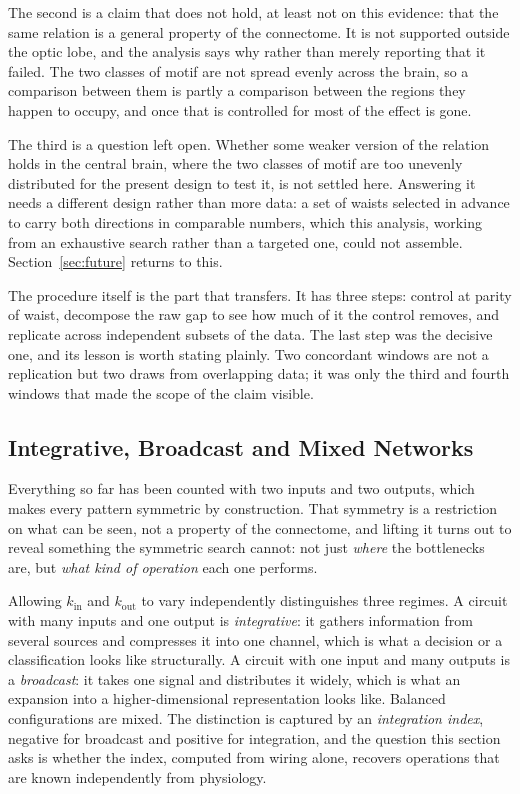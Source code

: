 \documentclass[12pt,a4paper,oneside]{article}
\theoremstyle{definition}
\theoremstyle{plain}
\newcommand{\kin}{k_{\mathrm{in}}}
\newcommand{\kout}{k_{\mathrm{out}}}
\begin{document}
The second is a claim that does not hold, at least not on this evidence: that
the same relation is a general property of the connectome. It is not
supported outside the optic lobe, and the analysis says why rather than
merely reporting that it failed. The two classes of motif are not spread
evenly across the brain, so a comparison between them is partly a comparison
between the regions they happen to occupy, and once that is controlled for
most of the effect is gone.

The third is a question left open. Whether some weaker version of the
relation holds in the central brain, where the two classes of motif are too
unevenly distributed for the present design to test it, is not settled here.
Answering it needs a different design rather than more data: a set of waists
selected in advance to carry both directions in comparable numbers, which
this analysis, working from an exhaustive search rather than a targeted one,
could not assemble. Section~\ref{sec:future} returns to this.

The procedure itself is the part that transfers. It has three steps:
control at parity of waist, decompose the raw gap to see how much of it the
control removes, and replicate across independent subsets of the data. The
last step was the decisive one, and its lesson is worth stating plainly. Two
concordant windows are not a replication but two draws from overlapping
data; it was only the third and fourth windows that made the scope of the
claim visible.

\subsection{Integrative, Broadcast and Mixed Networks}
\label{sec:results-sweep}

Everything so far has been counted with two inputs and two outputs, which
makes every pattern symmetric by construction. That symmetry is a
restriction on what can be seen, not a property of the connectome, and
lifting it turns out to reveal something the symmetric search cannot: not
just \emph{where} the bottlenecks are, but \emph{what kind of operation}
each one performs.

Allowing $\kin$ and $\kout$ to vary independently distinguishes three
regimes. A circuit with many inputs and one output is \emph{integrative}: it
gathers information from several sources and compresses it into one channel,
which is what a decision or a classification looks like structurally. A
circuit with one input and many outputs is a \emph{broadcast}: it takes one
signal and distributes it widely, which is what an expansion into a
higher-dimensional representation looks like. Balanced configurations are
mixed. The distinction is captured by an \emph{integration index}, negative
for broadcast and positive for integration, and the question this section
asks is whether the index, computed from wiring alone, recovers operations
that are known independently from physiology.
\end{document}
